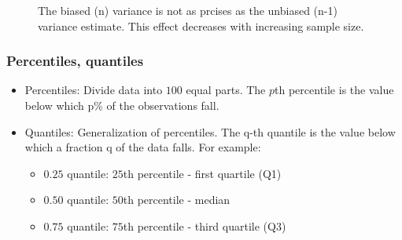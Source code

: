 \documentclass[
  a4paper,
]{scrbook}
\begin{document}
\begin{figure}[ht]


\caption{\label{fig-bessel-large-n}The biased (n) variance is not as
prcises as the unbiased (n-1) variance estimate. This effect decreases
with increasing sample size.}

\end{figure}%

\subsubsection{Percentiles, quantiles}\label{percentiles-quantiles}

\begin{itemize}
\item
  Percentiles: Divide data into \(100\) equal parts. The \(p\)th
  percentile is the value below which p\% of the observations fall.
\item
  Quantiles: Generalization of percentiles. The q-th quantile is the
  value below which a fraction q of the data falls. For example:

  \begin{itemize}
  \item
    \(0.25\) quantile: \(25\)th percentile - first quartile (Q1)
  \item
    \(0.50\) quantile: \(50\)th percentile - median
  \item
    \(0.75\) quantile: \(75\)th percentile - third quartile (Q3)
  \end{itemize}
\end{itemize}
\end{document}
